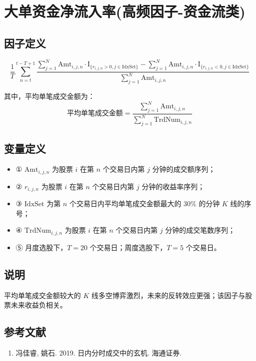 \documentclass{article}
\begin{document}
\section{大单资金净流入率(高频因子-资金流类)}

\subsection{因子定义}


\begin{equation}
    \frac{1}{T} \sum_{n=t}^{t-T+1} \frac{\sum_{j=1}^{N} \mathrm{Amt}_{i,j,n} \cdot \mathrm{I}_{\{r_{i,j,n}>0, j \in \mathrm{IdxSet}\}} - \sum_{j=1}^{N} \mathrm{Amt}_{i,j,n} \cdot \mathrm{I}_{\{r_{i,j,n}<0, j \in \mathrm{IdxSet}\}}}{\sum_{j=1}^{N} \mathrm{Amt}_{i,j,n}}
\end{equation}

其中，平均单笔成交金额为：
\begin{equation}
    \text{平均单笔成交金额} = \frac{\sum_{j=1}^{N} \mathrm{Amt}_{i,j,n}}{\sum_{j=1}^{N} \mathrm{TrdNum}_{i,j,n}}
\end{equation}

\subsection{变量定义}
\begin{itemize}
    \item ① \( \mathrm{Amt}_{i,j,n} \) 为股票 \( i \) 在第 \( n \) 个交易日内第 \( j \) 分钟的成交额序列；
    \item ② \( r_{i,j,n} \) 为股票 \( i \) 在第 \( n \) 个交易日内第 \( j \) 分钟的收益率序列；
    \item ③ \( \mathrm{IdxSet} \) 为第 \( n \) 个交易日内平均单笔成交金额最大的 30\% 的分钟 \( K \) 线的序号；
    \item ④ \( \mathrm{TrdNum}_{i,j,n} \) 为股票 \( i \) 在第 \( n \) 个交易日内第 \( j \) 分钟的成交笔数序列；
    \item ⑤ 月度选股下，\( T=20 \) 个交易日；周度选股下，\( T=5 \) 个交易日。
\end{itemize}

\subsection{说明}
平均单笔成交金额较大的 \( K \) 线多空博弈激烈，未来的反转效应更强；该因子与股票未来收益负相关。

\subsection{参考文献}
\begin{enumerate}
    \item 冯佳睿, 姚石. 2019. 日内分时成交中的玄机. 海通证券.
\end{enumerate}
\end{document}
